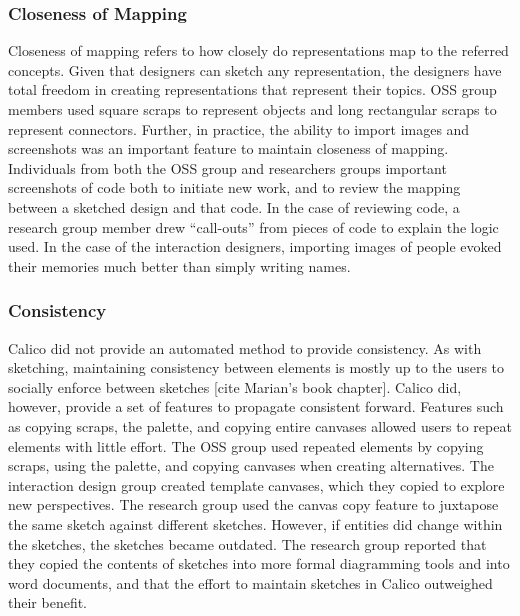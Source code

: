 %

\subsubsection{Closeness of Mapping}
Closeness of mapping refers to how closely do representations map to the referred concepts. Given that designers can sketch any representation, the designers have total freedom in creating representations that represent their topics. OSS group members used square scraps to represent objects and long rectangular scraps to represent connectors. Further, in practice, the ability to import images and screenshots was an important feature to maintain closeness of mapping. Individuals from both the OSS group and researchers groups important screenshots of code both to initiate new work, and to review the mapping between a sketched design and that code. In the case of reviewing code, a research group member drew ``call-outs'' from pieces of code to explain the logic used. In the case of the interaction designers, importing images of people evoked their memories much better than simply writing names.

%

\subsubsection{Consistency}
Calico did not provide an automated method to provide consistency. As with sketching, maintaining consistency between elements is mostly up to the users to socially enforce between sketches [cite Marian's book chapter]. Calico did, however, provide a set of features to propagate consistent forward. Features such as copying scraps, the palette, and copying entire canvases allowed users to repeat elements with little effort. The OSS group used repeated elements by copying scraps, using the palette, and copying canvases when creating alternatives. The interaction design group created template canvases, which they copied to explore new perspectives. The research group used the canvas copy feature to juxtapose the same sketch against different sketches. However, if entities did change within the sketches, the sketches became outdated. The research group reported that they copied the contents of sketches into more formal diagramming tools and into word documents, and that the effort to maintain sketches in Calico outweighed their benefit.

